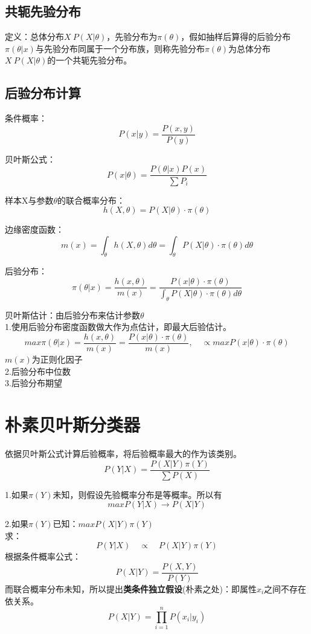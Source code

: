 \documentclass[UTF8]{ctexart} %
\begin{document}
		\subsection{共轭先验分布}
			定义：总体分布$X~P(X|\theta)$，先验分布为$\pi(\theta)$，假如抽样后算得的后验分布$\pi(\theta|x)$与先验分布同属于一个分布族，则称先验分布$\pi(\theta)$为总体分布$X~P(X|\theta)$的一个共轭先验分布。
		\subsection{后验分布计算}
			条件概率：
			\[P(x|y) = \frac{P(x,y)}{P(y)}\]	
			
			贝叶斯公式：
			\[P(x|\theta) = \frac{P(\theta|x)P(x)}{\sum P_i}\]
			
			样本X与参数$\theta$的联合概率分布：
			\[h(X,\theta) = P(X|\theta)\cdot\pi(\theta)\]
			
			边缘密度函数：
			\[m(x) = \int_\theta h(X,\theta)d\theta = \int_\theta P(X|\theta)\cdot\pi(\theta) d\theta\] 
			 
			后验分布：
			\[\pi(\theta|x) =  \frac{h(x,\theta)}{m(x)} = \frac{P(x|\theta)\cdot \pi(\theta)}{\int_\theta P(X|\theta)\cdot\pi(\theta) d\theta}\]
			
		
			贝叶斯估计：由后验分布来估计参数$\theta$\\
			1.使用后验分布密度函数做大作为点估计，即最大后验估计。
			\[max\pi(\theta|x) = \frac{h(x,\theta)}{m(x)} = \frac{P(x|\theta)\cdot \pi(\theta)}{m(x)},\quad \propto max P(x|\theta)\cdot \pi(\theta)\]
			$m(x)$为正则化因子\\
			2.后验分布中位数\\
			3.后验分布期望
	
	\section{朴素贝叶斯分类器}
		依据贝叶斯公式计算后验概率，将后验概率最大的作为该类别。
		\[P(Y|X) = \frac{P(X|Y)\pi(Y)}{\sum P(X)}\]
		
		1.如果$\pi(Y)$未知，则假设先验概率分布是等概率。所以有
		\[maxP(Y|X)\rightarrow P(X|Y)\]
		
		2.如果$\pi(Y)$已知：$maxP(X|Y)\pi(Y)$\\
		
		求：
		\[P(Y|X) \quad\propto\quad P(X|Y)\pi(Y)\]
		根据条件概率公式：
		\[P(X|Y) = \frac{P(X,Y)}{P(Y)}\]
		而联合概率分布未知，所以提出\textbf{类条件独立假设}(朴素之处)：即属性$x_i$之间不存在依关系。
		\[P(X|Y) = \prod_{i=1}^nP(x_i|y_i)\]
			
\end{document}
